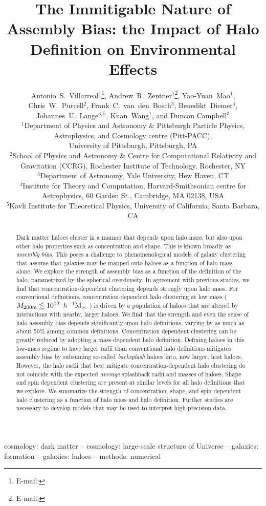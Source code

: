 \documentclass[usenatbib,fleqn]{mnras}
\title[The Immitigable Nature of Assembly Bias]{The Immitigable Nature of Assembly
Bias: the Impact of Halo Definition on Environmental Effects}
\author[A.~S.~Villarreal et al.]{%
Antonio~S.~Villarreal$^{1}$\thanks{E-mail: \email{asv13@pitt.edu}},
Andrew~R.~Zentner$^{1}$\thanks{E-mail: \email{zentner@pitt.edu}},
Yao-Yuan~Mao$^{1}$, %
Chris~W.~Purcell$^{2}$,%
\newauthor
Frank~C.~van~den~Bosch$^{3}$, %
Benedikt~Diemer$^{4}$, %
Johannes~U.~Lange$^{3,5}$,
Kuan~Wang$^{1}$, 
\newauthor
and Duncan Campbell$^{3}$
\vspace*{8pt}
\\
$^{1}$Department of Physics and Astronomy \& Pittsburgh Particle Physics, Astrophysics, and Cosmology centre (Pitt-PACC), \\
\phantom{$^{1}$}University of Pittsburgh, Pittsburgh, PA\\
$^{2}$School of Physics and Astronomy \& Centre for Computational Relativity and Gravitation (CCRG), Rochester Institute of Technology, Rochester, NY \\
$^{3}$Department of Astronomy, Yale University, Hew Haven, CT\\
$^{4}$Institute for Theory and Computation, Harvard-Smithsonian centre for Astrophysics, 60 Garden St., Cambridge, MA 02138, USA \\
$^{5}$Kavli Institute for Theoretical Physics, University of California, Santa Barbara, CA}
\begin{document}
\label{firstpage}
\pagerange{\pageref{firstpage}--\pageref{lastpage}} 

\maketitle

\begin{abstract}

Dark matter haloes cluster in a manner that depends upon halo mass, but also upon other halo properties such as concentration and shape. This is known broadly as {\em assembly bias}. This poses a challenge to phenomenological models of galaxy clustering that assume that galaxies may be mapped onto haloes as a function of halo mass alone. We explore the strength of assembly bias as a function of the definition of the halo, parametrized by the spherical overdensity. In agreement with previous studies, we find that concentration-dependent clustering depends strongly upon halo mass. For conventional definitions, concentration-dependent halo clustering at low mass ($M_{200\text{m}} \lesssim 10^{12}\, \ h^{-1}\mathrm{M}_{\odot}~$) is driven by a population of haloes that are altered by interactions with nearby, larger haloes. We find that the strength and even the sense of halo assembly bias depends significantly upon halo definitions, varying by as much as about 50\% among common definitions. Concentration dependent clustering can be greatly reduced by adopting a mass-dependent halo definition. Defining haloes in this low-mass regime to have larger radii than conventional halo definitions mitigates assembly bias by subsuming so-called {\em backsplash} haloes into, now larger, host haloes. However, the halo radii that best mitigate concentration-dependent halo clustering do not coincide with the expected {\em average} splashback radii and masses of haloes. Shape and spin dependent clustering are present at similar levels for all halo definitions that we explore. We summarize the strength of concentration, shape, and spin dependent halo clustering as a function of halo mass and halo definition. Further studies are necessary to develop models that may be used to interpret high-precision data.

\end{abstract}

\begin{keywords}
cosmology: dark matter -- cosmology: large-scale structure of Universe -- galaxies: formation -- galaxies: haloes -- methods: numerical
\end{keywords}
\end{document}
